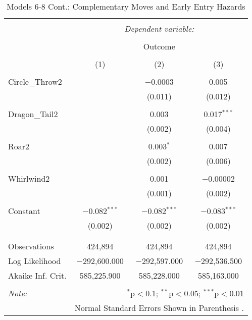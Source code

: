\documentclass[12pt,twoside]{reedthesis}
\begin{document}
  \begin{table}[!htbp] \centering 
    \caption{Models 6-8 Cont.: Complementary Moves and Early Entry Hazards} 
    \label{} 
  \begin{tabular}{@{\extracolsep{5pt}}lccc} 
  \\[-1.8ex]\hline 
  \hline \\[-1.8ex] 
   & \multicolumn{3}{c}{\textit{Dependent variable:}} \\ 
  \cline{2-4} 
  \\[-1.8ex] & \multicolumn{3}{c}{Outcome} \\ 
  \\[-1.8ex] & (1) & (2) & (3)\\ 
  \hline \\[-1.8ex] 
   Circle\_Throw2 &  & $-$0.0003 & 0.005 \\ 
    &  & (0.011) & (0.012) \\ 
    & & & \\ 
   Dragon\_Tail2 &  & 0.003 & 0.017$^{***}$ \\ 
    &  & (0.002) & (0.004) \\ 
    & & & \\ 
   Roar2 &  & 0.003$^{*}$ & 0.007 \\ 
    &  & (0.002) & (0.006) \\ 
    & & & \\ 
   Whirlwind2 &  & 0.001 & $-$0.00002 \\ 
    &  & (0.001) & (0.002) \\ 
    & & & \\ 
   Constant & $-$0.082$^{***}$ & $-$0.082$^{***}$ & $-$0.083$^{***}$ \\ 
    & (0.002) & (0.002) & (0.002) \\ 
    & & & \\ 
  \hline \\[-1.8ex] 
  Observations & 424,894 & 424,894 & 424,894 \\ 
  Log Likelihood & $-$292,600.000 & $-$292,597.000 & $-$292,536.500 \\ 
  Akaike Inf. Crit. & 585,225.900 & 585,228.000 & 585,163.000 \\ 
  \hline 
  \hline \\[-1.8ex] 
  \textit{Note:}  & \multicolumn{3}{r}{$^{*}$p$<$0.1; $^{**}$p$<$0.05; $^{***}$p$<$0.01} \\ 
   & \multicolumn{3}{r}{Normal Standard Errors Shown in Parenthesis .} \\ 
  \end{tabular} 
  \end{table}
  
\end{document}
